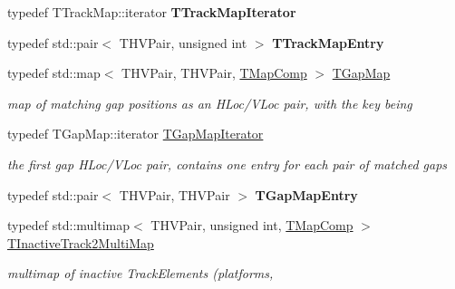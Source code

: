 \begin{DoxyCompactItemize}
\mbox{\label{class_t_track_a89e099488b224b6b85e2f112c4889fd0}} 
typedef T\+Track\+Map\+::iterator {\bfseries T\+Track\+Map\+Iterator}
\item 
\mbox{\label{class_t_track_a88632999c299ea51ecc1a7eceb60040e}} 
typedef std\+::pair$<$ T\+H\+V\+Pair, unsigned int $>$ {\bfseries T\+Track\+Map\+Entry}
\item 
\mbox{\label{class_t_track_a57d1f751f59c96c16918a044b3d271f7}} 
typedef std\+::map$<$ T\+H\+V\+Pair, T\+H\+V\+Pair, \mbox{\hyperlink{class_t_map_comp}{T\+Map\+Comp}} $>$ \mbox{\hyperlink{class_t_track_a57d1f751f59c96c16918a044b3d271f7}{T\+Gap\+Map}}
\begin{DoxyCompactList}\small\item\em map of matching gap positions as an H\+Loc/\+V\+Loc pair, with the key being \end{DoxyCompactList}\item 
\mbox{\label{class_t_track_a59d0d360b7897d3364135f3882ec495a}} 
typedef T\+Gap\+Map\+::iterator \mbox{\hyperlink{class_t_track_a59d0d360b7897d3364135f3882ec495a}{T\+Gap\+Map\+Iterator}}
\begin{DoxyCompactList}\small\item\em the first gap H\+Loc/\+V\+Loc pair, contains one entry for each pair of matched gaps \end{DoxyCompactList}\item 
\mbox{\label{class_t_track_a9f68c117c1cee4a7d767de13a4232925}} 
typedef std\+::pair$<$ T\+H\+V\+Pair, T\+H\+V\+Pair $>$ {\bfseries T\+Gap\+Map\+Entry}
\item 
\mbox{\label{class_t_track_ab54f3c0560218084f75c55ff87409417}} 
typedef std\+::multimap$<$ T\+H\+V\+Pair, unsigned int, \mbox{\hyperlink{class_t_map_comp}{T\+Map\+Comp}} $>$ \mbox{\hyperlink{class_t_track_ab54f3c0560218084f75c55ff87409417}{T\+Inactive\+Track2\+Multi\+Map}}
\begin{DoxyCompactList}\small\item\em multimap of inactive Track\+Elements (platforms, \end{DoxyCompactList}\item 
\mbox{\label{class_t_track_a6072881896a545945cbcc26e8307bb68}} 

\end{DoxyCompactItemize}
